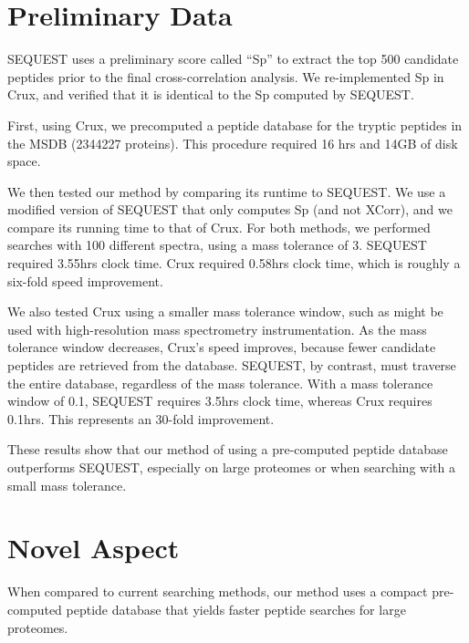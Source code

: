 \documentclass[12pt]{article}
\begin{document}
\section{Preliminary Data}

SEQUEST uses a preliminary score called ``Sp'' to extract the top 500
candidate peptides prior to the final cross-correlation analysis.
We re-implemented Sp in Crux, and verified that it is identical to the
Sp computed by SEQUEST.


First, using Crux, we precomputed a peptide database for the tryptic
peptides in the MSDB (2344227 proteins).  This procedure required 16
hrs and 14GB of disk space.

We then tested our method by comparing its runtime to SEQUEST.  We use
a modified version of SEQUEST that only computes Sp (and not XCorr),
and we compare its running time to that of Crux.  For both methods, we
performed searches with 100 different spectra, using a mass tolerance
of 3.  SEQUEST required 3.55hrs clock time. Crux required 0.58hrs clock time, 
which is roughly a six-fold speed improvement.

We also tested Crux using a smaller mass tolerance window, such
as might be used with high-resolution mass spectrometry
instrumentation.  As the mass tolerance window decreases, Crux's speed
improves, because fewer candidate peptides are retrieved from the
database.  SEQUEST, by contrast, must traverse the entire database,
regardless of the mass tolerance.  With a mass tolerance window of
0.1, SEQUEST requires 3.5hrs clock time, whereas Crux requires 
0.1hrs.  This represents an 30-fold improvement.

These results show that our method of using a pre-computed peptide
database outperforms SEQUEST, especially on large proteomes or when
searching with a small mass tolerance.

\section{Novel Aspect}

When compared to current searching methods, our method uses a compact
pre-computed peptide database that yields faster peptide searches for
large proteomes.
\end{document}
